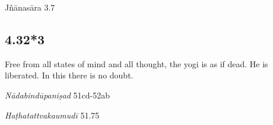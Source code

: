 \begin{ekdosis}
\begin{sources}[hp04_032_2]
Jñānasāra 3.7
\begin{versinnote}
\end{versinnote}
\end{sources}



\subsection*{4.32*3}
\begin{translation}[hp04_032_3]
Free from all states of mind and all thought, the yogi is as if dead. He is liberated. In this there is no doubt.
\end{translation}


\begin{testimonia}[hp04_032_3]
\emph{Nādabindūpaniṣad} 51cd-52ab
\begin{versinnote}
\end{versinnote}

\emph{Haṭhatattvakaumudī} 51.75
\begin{versinnote}
\end{versinnote}
\end{testimonia}



\end{ekdosis}

